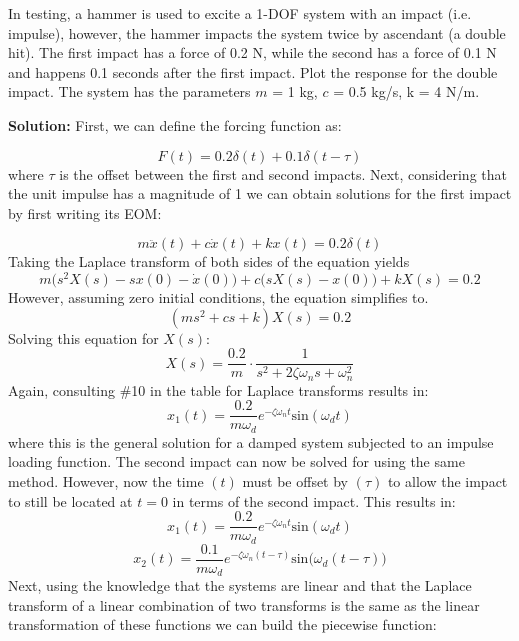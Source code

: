 \documentclass[12pt,letter]{article}
\begin{document}
\begin{example}
	
	
	In testing, a hammer is used to excite a 1-DOF system with an impact (i.e. impulse), however, the hammer impacts the system twice by ascendant (a double hit). The first impact has a force of 0.2 N, while the second has a force of 0.1 N and happens 0.1 seconds after the first impact. Plot the response for the double impact. The system has the parameters $m$ = 1 kg, $c$ = 0.5 kg/s, k = 4 N/m. 
	
	\noindent\textbf{Solution:} First, we can define the forcing function as:
	
	\begin{equation}
		F(t) = 0.2 \delta (t) + 0.1 \delta(t-\tau)
	\end{equation}
	where $\tau$ is the offset between the first and second impacts. Next, considering that the unit impulse has a magnitude of 1 we can obtain solutions for the first impact by first writing its EOM:
	
	\begin{equation}
		m\ddot{x}(t) +c\dot{x}(t) +kx(t) =0.2 \delta(t)
	\end{equation}
	Taking the Laplace transform of both sides of the equation yields 
	\begin{equation}
		m\big(s^2X(s)-sx(0) - \dot{x}(0)\big) + c\big(sX(s)-x(0)\big) +kX(s) = 0.2
	\end{equation}
	However, assuming zero initial conditions, the equation simplifies to. 
	\begin{equation}
		(ms^2 + cs +k)X(s) = 0.2
	\end{equation}
	Solving this equation for $X(s)$:
	\begin{equation}
		X(s) = \frac{0.2}{m} \cdot \frac{1}{s^2 + 2 \zeta \omega_n s + \omega_n^2}
	\end{equation}
	Again, consulting \#10 in the table for Laplace transforms results in:
	\begin{equation}
		x_1(t) = \frac{0.2}{m \omega_d} e^{-\zeta \omega_n t} \text{sin}(\omega_dt)
	\end{equation}
	where this is the general solution for a damped system subjected to an impulse loading function. The second impact can now be solved for using the same method. However, now the time $(t)$ must be offset by $(\tau)$ to allow the impact to still be located at $t=0$ in terms of the second impact. This results in:
	\begin{equation}
		x_1(t) = \frac{0.2}{m \omega_d} e^{-\zeta \omega_n t} \text{sin}(\omega_dt)
	\end{equation}
	\begin{equation}
		x_2(t) = \frac{0.1}{m \omega_d} e^{-\zeta \omega_n (t-\tau)} \text{sin}\big(\omega_d(t-\tau)\big)
	\end{equation}
	Next, using the knowledge that the systems are linear and that the Laplace transform of a linear combination of two transforms is the same as the linear transformation of these functions we can build the piecewise function:
	

\end{example}
\end{document}
